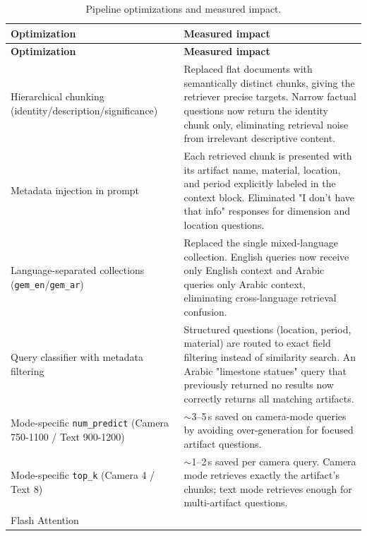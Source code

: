 \begin{longtable}[c]{@{}>{\raggedright\arraybackslash}p{}p{}@{}}
	\caption{Pipeline optimizations and measured impact.\label{tab:opts}}\\
	\hline
	\textbf{Optimization} & \textbf{Measured impact}\\
	\hline
	\endfirsthead
	\hline
	\textbf{Optimization} & \textbf{Measured impact}\\
	\hline
	\endhead
	\hline
	\multicolumn{2}{r}{\footnotesize(To be continued)}
	\endfoot
	\hline
	\endlastfoot
Hierarchical chunking
(identity/description/significance)			& Replaced flat documents with semantically distinct chunks, giving the retriever precise targets. Narrow factual questions now return the identity chunk only, eliminating retrieval noise from irrelevant descriptive content.\\
Metadata injection in prompt				& Each retrieved chunk is presented with its artifact name, material, location, and period explicitly labeled in the context block. Eliminated "I don't have that info" responses for dimension and location questions.\\
Language-separated collections
(\texttt{gem\_en}/\texttt{gem\_ar})			& Replaced the single mixed-language collection. English queries now receive only English context and Arabic queries only Arabic context, eliminating cross-language retrieval confusion.\\
Query classifier with metadata filtering	& Structured questions (location, period, material) are routed to exact field filtering instead of similarity search. An Arabic "limestone statues" query that previously returned no results now correctly returns all matching artifacts.\\
Mode-specific \texttt{num\_predict}
(Camera 750-1100 / Text 900-1200)						& $\sim$3--5\,s saved on camera-mode queries by avoiding over-generation for focused artifact questions.\\
Mode-specific \texttt{top\_k}
(Camera 4 / Text 8)							& $\sim$1--2\,s saved per camera query. Camera mode retrieves exactly the artifact's chunks; text mode retrieves enough for multi-artifact questions.\\
Flash Attention

\end{longtable}
